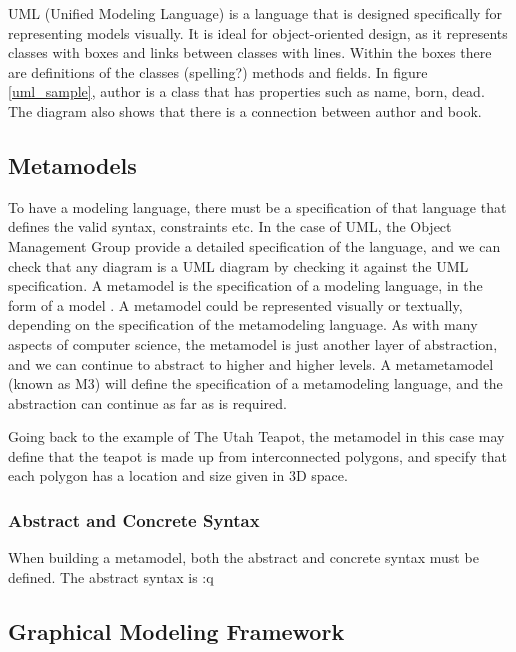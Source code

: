 UML (Unified Modeling Language) is a language that is designed specifically for representing models visually. It is ideal for object-oriented design, as it represents classes with boxes and links between classes with lines. Within the boxes there are definitions of the classes (spelling?) methods and fields. In figure \ref{uml_sample}, author is a class that has properties such as name, born, dead. The diagram also shows that there is a connection between author and book.

\subsection{Metamodels}
To have a modeling language, there must be a specification of that language that defines the valid syntax, constraints etc. In the case of UML, the Object Management Group provide a detailed specification \citep{umlSpec} of the language, and we can check that any diagram is a UML diagram by checking it against the UML specification.
A metamodel is the specification of a modeling language, in the form of a model \citep{brambillaBook}. A metamodel could be represented visually or textually, depending on the specification of the metamodeling language. As with many aspects of computer science, the metamodel is just another layer of abstraction, and we can continue to abstract to higher and higher levels. A metametamodel (known as M3) will define the specification of a metamodeling language, and the abstraction can continue as far as is required.

Going back to the example of The Utah Teapot, the metamodel in this case may define that the teapot is made up from interconnected polygons, and specify that each polygon has a location and size given in 3D space. 

\subsubsection{Abstract and Concrete Syntax}

When building a metamodel, both the abstract and concrete syntax must be defined. The abstract syntax is :q


\subsection{Graphical Modeling Framework}

